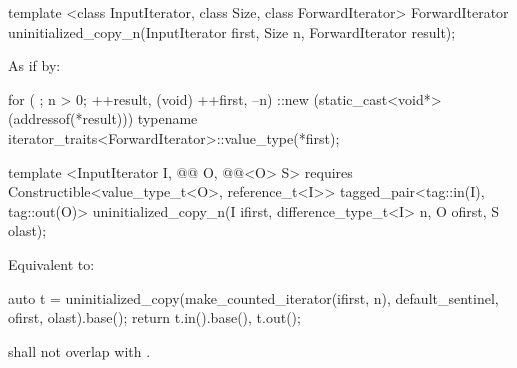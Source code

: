{\color{remclr}
\begin{codeblock}
template <class InputIterator, class Size, class ForwardIterator>
  ForwardIterator uninitialized_copy_n(InputIterator first, Size n,
                                       ForwardIterator result);
\end{codeblock}

\setcounter{Paras}{2}
\pnum
\effects As if by:
\begin{codeblock}
        for ( ; n > 0; ++result, (void) ++first, --n) {
          ::new (static_cast<void*>(addressof(*result)))
            typename iterator_traits<ForwardIterator>::value_type(*first);
        }
\end{codeblock}

\pnum
\returns {}
} %

{\color{addclr}
\begin{codeblock}
template <InputIterator I, @@ O, @@<O> S>
  requires
Constructible<value_type_t<O>, reference_t<I>>
  tagged_pair<tag::in(I), tag::out(O)>
uninitialized_copy_n(I ifirst, difference_type_t<I> n, O ofirst, S olast);
\end{codeblock}

\setcounter{Paras}{4}
\pnum
\effects Equivalent to:
\begin{codeblock}
    auto t = uninitialized_copy(make_counted_iterator(ifirst, n),
                                default_sentinel{}, ofirst, olast).base();
    return {t.in().base(), t.out()};
\end{codeblock}

\pnum
\requires {} shall not overlap with .

} %

